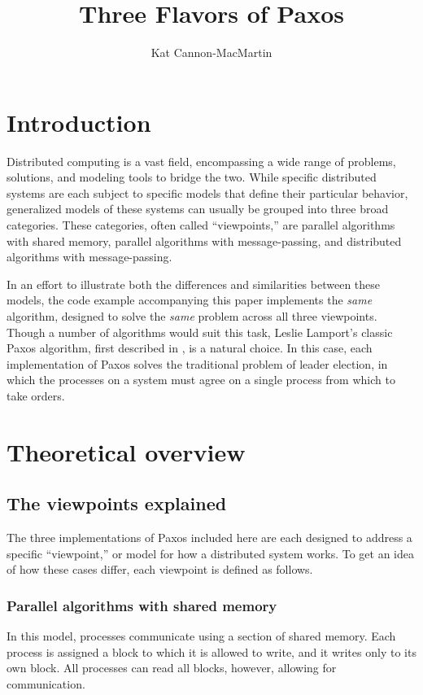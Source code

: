 \documentclass[12pt]{article}
\begin{document}
\title{Three Flavors of Paxos}

\author{Kat Cannon-MacMartin}


\maketitle

\tableofcontents

\pagebreak

\section{Introduction}
Distributed computing is a vast field, encompassing
a wide range of problems, solutions, and modeling
tools to bridge the two. While specific distributed systems
are each subject to specific models that define their particular
behavior, generalized models of these systems can usually be
grouped into three broad categories. These categories, often
called ``viewpoints,'' are parallel algorithms with shared memory,
parallel algorithms with message-passing, and
distributed algorithms with message-passing.

In an effort to illustrate
both the differences and similarities between these models, the code
example accompanying this paper implements the \textit{same} algorithm,
designed to solve the \textit{same} problem across all three viewpoints.
Though a number of algorithms would suit this task, Leslie Lamport's
classic Paxos algorithm, first described in \cite{par}, is a natural choice.
In this case, each implementation of Paxos solves the traditional problem
of leader election, in which the processes on a system must agree on a single
process from which to take orders.

\section{Theoretical overview}
\subsection{The viewpoints explained}
The three implementations of Paxos included here are each designed to address
a specific ``viewpoint,'' or model for how a distributed system works.
To get an idea of how these cases differ, each viewpoint is defined as follows.

\subsubsection{Parallel algorithms with shared memory}
In this model, processes communicate using a section of shared memory. Each
process is assigned a block to which it is allowed to write, and it writes
only to its own block. All processes can read all blocks, however, allowing
for communication.
\end{document}
